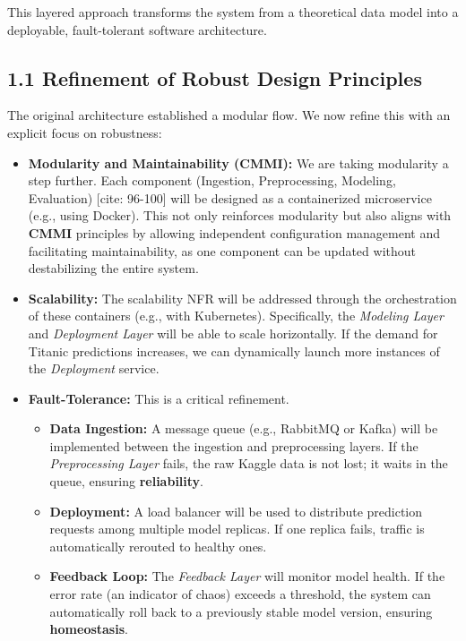 \documentclass[12pt]{report}
\begin{document}
This layered approach transforms the system from a theoretical data model into a deployable, fault-tolerant software architecture.

\subsection*{1.1 Refinement of Robust Design Principles}

The original architecture established a modular flow. We now refine this with an explicit focus on robustness:

\begin{itemize}
    \item \textbf{Modularity and Maintainability (CMMI):} We are taking modularity a step further. Each component (Ingestion, Preprocessing, Modeling, Evaluation) [cite: 96-100] will be designed as a containerized microservice (e.g., using Docker). This not only reinforces modularity but also aligns with \textbf{CMMI} principles by allowing independent configuration management and facilitating maintainability, as one component can be updated without destabilizing the entire system.

    \item \textbf{Scalability:} The scalability NFR will be addressed through the orchestration of these containers (e.g., with Kubernetes). Specifically, the \textit{Modeling Layer} and \textit{Deployment Layer} will be able to scale horizontally. If the demand for Titanic predictions increases, we can dynamically launch more instances of the \textit{Deployment} service.

    \item \textbf{Fault-Tolerance:} This is a critical refinement.
    \begin{itemize}
        \item \textbf{Data Ingestion:} A message queue (e.g., RabbitMQ or Kafka) will be implemented between the ingestion and preprocessing layers. If the \textit{Preprocessing Layer} fails, the raw Kaggle data is not lost; it waits in the queue, ensuring \textbf{reliability}.
        \item \textbf{Deployment:} A load balancer will be used to distribute prediction requests among multiple model replicas. If one replica fails, traffic is automatically rerouted to healthy ones.
        \item \textbf{Feedback Loop:} The \textit{Feedback Layer} will monitor model health. If the error rate (an indicator of chaos) exceeds a threshold, the system can automatically roll back to a previously stable model version, ensuring \textbf{homeostasis}.
    \end{itemize}
\end{itemize}
\end{document}
